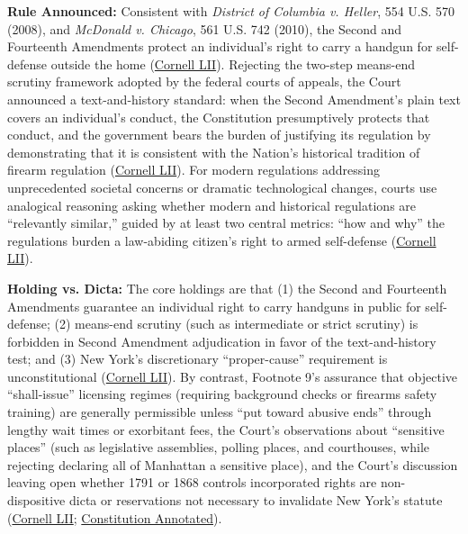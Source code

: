 \documentclass[12pt]{article}
\begin{document}
\textbf{Rule Announced:} Consistent with \textit{District of Columbia v. Heller}, 554 U.S. 570 (2008), and \textit{McDonald v. Chicago}, 561 U.S. 742 (2010), the Second and Fourteenth Amendments protect an individual's right to carry a handgun for self-defense outside the home (\href{https://www.law.cornell.edu/supremecourt/text/20-843}{Cornell LII}). Rejecting the two-step means-end scrutiny framework adopted by the federal courts of appeals, the Court announced a text-and-history standard: when the Second Amendment's plain text covers an individual's conduct, the Constitution presumptively protects that conduct, and the government bears the burden of justifying its regulation by demonstrating that it is consistent with the Nation's historical tradition of firearm regulation (\href{https://www.law.cornell.edu/supremecourt/text/20-843}{Cornell LII}). For modern regulations addressing unprecedented societal concerns or dramatic technological changes, courts use analogical reasoning asking whether modern and historical regulations are ``relevantly similar,'' guided by at least two central metrics: ``how and why'' the regulations burden a law-abiding citizen's right to armed self-defense (\href{https://www.law.cornell.edu/supremecourt/text/20-843}{Cornell LII}).

\textbf{Holding vs. Dicta:} The core holdings are that (1) the Second and Fourteenth Amendments guarantee an individual right to carry handguns in public for self-defense; (2) means-end scrutiny (such as intermediate or strict scrutiny) is forbidden in Second Amendment adjudication in favor of the text-and-history test; and (3) New York's discretionary ``proper-cause'' requirement is unconstitutional (\href{https://www.law.cornell.edu/supremecourt/text/20-843}{Cornell LII}). By contrast, Footnote 9's assurance that objective ``shall-issue'' licensing regimes (requiring background checks or firearms safety training) are generally permissible unless ``put toward abusive ends'' through lengthy wait times or exorbitant fees, the Court's observations about ``sensitive places'' (such as legislative assemblies, polling places, and courthouses, while rejecting declaring all of Manhattan a sensitive place), and the Court's discussion leaving open whether 1791 or 1868 controls incorporated rights are non-dispositive dicta or reservations not necessary to invalidate New York's statute (\href{https://www.law.cornell.edu/supremecourt/text/20-843}{Cornell LII}; \href{https://www.law.cornell.edu/constitution-conan/amendment-2/the-bruen-decision-and-concealed-carry-licenses}{Constitution Annotated}).
\end{document}

